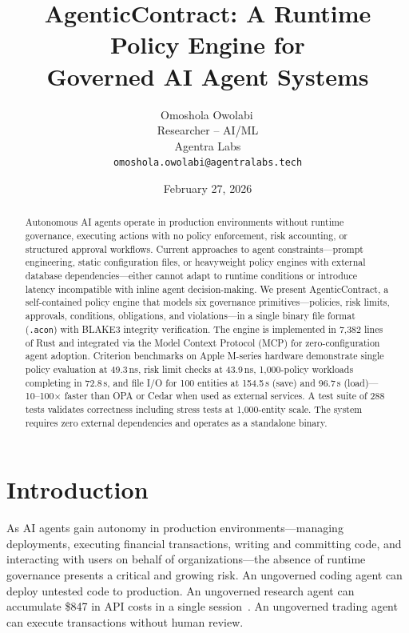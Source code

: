 \documentclass[10pt, twocolumn]{article}
\title{\textbf{AgenticContract: A Runtime Policy Engine for\\Governed AI Agent Systems}}
\author{Omoshola Owolabi\,\orcidlink{0009-0006-4089-0732}\\Researcher -- AI/ML\\Agentra Labs\\\texttt{omoshola.owolabi@agentralabs.tech}}
\date{February 27, 2026}
\begin{document}
\maketitle
\thispagestyle{fancy}

\begin{abstract}
Autonomous AI agents operate in production environments without runtime governance, executing actions with no policy enforcement, risk accounting, or structured approval workflows. Current approaches to agent constraints---prompt engineering, static configuration files, or heavyweight policy engines with external database dependencies---either cannot adapt to runtime conditions or introduce latency incompatible with inline agent decision-making. We present AgenticContract, a self-contained policy engine that models six governance primitives---policies, risk limits, approvals, conditions, obligations, and violations---in a single binary file format (\texttt{.acon}) with BLAKE3 integrity verification. The engine is implemented in 7{,}382 lines of Rust and integrated via the Model Context Protocol (MCP) for zero-configuration agent adoption. Criterion benchmarks on Apple M-series hardware demonstrate single policy evaluation at 49.3\,ns, risk limit checks at 43.9\,ns, 1{,}000-policy workloads completing in 72.8\,\textmu{}s, and file I/O for 100 entities at 154.5\,\textmu{}s (save) and 96.7\,\textmu{}s (load)---10--100$\times$ faster than OPA or Cedar when used as external services. A test suite of 288 tests validates correctness including stress tests at 1{,}000-entity scale. The system requires zero external dependencies and operates as a standalone binary.
\end{abstract}

\section{Introduction}
\label{sec:intro}

As AI agents gain autonomy in production environments---managing deployments, executing financial transactions, writing and committing code, and interacting with users on behalf of organizations---the absence of runtime governance presents a critical and growing risk. An ungoverned coding agent can deploy untested code to production. An ungoverned research agent can accumulate \$847 in API costs in a single session~\cite{chen2024agentcost}. An ungoverned trading agent can execute transactions without human review.
\end{document}
